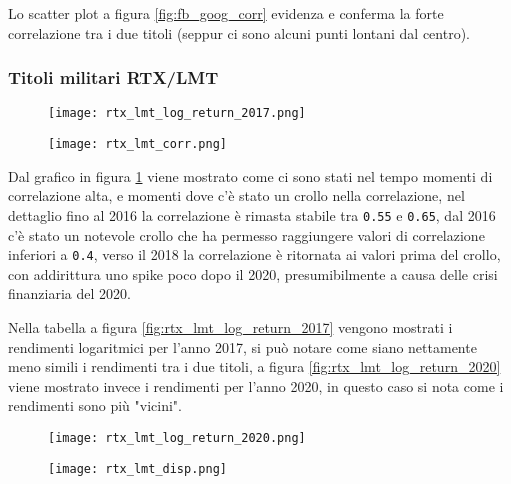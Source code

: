 Lo scatter plot a figura \ref{fig:fb_goog_corr} evidenza e conferma la forte correlazione tra i due titoli (seppur ci sono alcuni punti lontani dal centro).

\pagebreak

\subsubsection{Titoli militari RTX/LMT}

\begin{figure}[h]
  \centering
  \begin{minipage}{.4\textwidth}
    \centering
    \texttt{[image: rtx\_lmt\_log\_return\_2017.png]}
    \label{fig:rtx_lmt_log_return_2017}
  \end{minipage}%
  \begin{minipage}{.6\textwidth}
    \centering
    \texttt{[image: rtx\_lmt\_corr.png]}
    \label{fig:rtx_lmt_corr}
  \end{minipage}
\end{figure}

Dal grafico in figura \ref{fig:rtx_lmt_corr} viene mostrato come ci sono stati nel tempo momenti di correlazione alta, e momenti dove c'è stato un crollo nella correlazione, nel dettaglio
fino al 2016 la correlazione è rimasta stabile tra \verb|0.55| e \verb|0.65|, dal 2016 c'è stato un notevole crollo che ha permesso raggiungere  valori di correlazione inferiori a \verb|0.4|,
verso il 2018 la correlazione è ritornata ai valori prima del crollo, con addirittura uno spike poco dopo il 2020, presumibilmente a causa delle crisi finanziaria del 2020.

Nella tabella a figura \ref{fig:rtx_lmt_log_return_2017} vengono mostrati i rendimenti logaritmici per l'anno 2017, si può notare come siano
nettamente meno simili i rendimenti tra i due titoli, a figura \ref{fig:rtx_lmt_log_return_2020} viene mostrato invece i rendimenti per l'anno 2020, in questo caso si nota come i rendimenti sono più "vicini".

\begin{figure}[h]
  \centering
  \begin{minipage}{.4\textwidth}
    \centering
    \texttt{[image: rtx\_lmt\_log\_return\_2020.png]}
    \label{fig:rtx_lmt_log_return_2020}
  \end{minipage}%
  \begin{minipage}{.6\textwidth}
    \centering
    \texttt{[image: rtx\_lmt\_disp.png]}
    \label{fig:rtx_lmt_disp}
  \end{minipage}
\end{figure}

